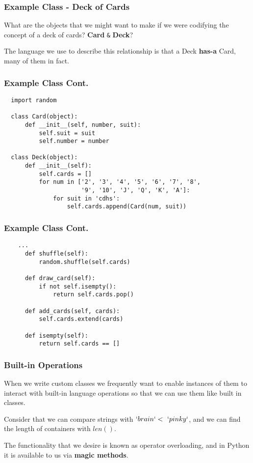 \documentclass{beamer}
\begin{document}
\begin{frame}
  \frametitle{Example Class - Deck of Cards}
  What are the objects that we might want to make if we were codifying the concept of a deck of cards? \pause \textbf{Card} \texttt{\&} \textbf{Deck}? \vspace{5mm}
  \pause

  The language we use to describe this relationship is that a Deck \textbf{has-a} Card, many of them in fact. \vspace{1mm}
\end{frame}

\begin{frame}[fragile]
  \frametitle{Example Class Cont.}
  \begin{lstlisting}
  import random

  class Card(object):
      def __init__(self, number, suit):
          self.suit = suit
          self.number = number

  class Deck(object):
      def __init__(self):
          self.cards = []
          for num in ['2', '3', '4', '5', '6', '7', '8',
                      '9', '10', 'J', 'Q', 'K', 'A']:
              for suit in 'cdhs':
                  self.cards.append(Card(num, suit))
  \end{lstlisting}
\end{frame}

\begin{frame}[fragile]
  \frametitle{Example Class Cont.}
  \begin{lstlisting}
    ...
      def shuffle(self):
          random.shuffle(self.cards)

      def draw_card(self):
          if not self.isempty():
              return self.cards.pop()

      def add_cards(self, cards):
          self.cards.extend(cards)

      def isempty(self):
          return self.cards == []
  \end{lstlisting}
\end{frame}

\begin{frame}
  \frametitle{Built-in Operations}
  When we write custom classes we frequently want to enable instances of them to interact with built-in language operations so that we can use them like built in classes. \vspace{4mm}
  
  Consider that we can compare strings with $`brain` <\ `pinky`$, and we can find the length of containers with $len()$. \vspace{4mm}
  \pause

  \begin{block}{}
    The functionality that we desire is known as operator overloading, and in Python it is available to us via \textbf{magic methods}.
  \end{block}
\end{frame}
\end{document}
